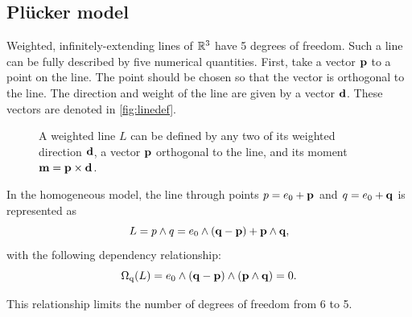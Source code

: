 \subsection{Pl\"ucker model}
\label{sec:hongbo}
\label{sec:plucker}


Weighted, infinitely-extending lines of $\mathbb{R}^3$ have 5 degrees of freedom.  Such a line can be fully described by five numerical quantities. First, take a vector $\mathbf{p}$ to a point on the line.  The point should be chosen so that the vector is orthogonal to the line.  The direction and weight of the line are given by a vector $\mathbf{d}$.  These vectors are denoted in \autoref{fig:linedef}.

\begin{figure}
  \caption{A weighted line $L$ can be defined by any two of its weighted direction $\mathbf{d}$, a vector $\mathbf{p}$ orthogonal to the line, and its moment $\mathbf{m} = \mathbf{p} \times \mathbf{d}$.}
  \label{fig:linedef}
  \begin{center}
  \end{center}
\end{figure}

In the homogeneous model, the line through points $p = e_0 + \mathbf{p}$ and $q = e_0 + \mathbf{q}$ is represented as 
\begin{equation*}
  L = p \wedge q = e_0 \wedge (\mathbf{q} - \mathbf{p}) + \mathbf{p} \wedge \mathbf{q} ,
\end{equation*}
with the following dependency relationship: 
\begin{equation} \label{eq:gaplucker0} 
  \operatorname{\Omega_q}(L) = e_0 \wedge (\mathbf{q} - \mathbf{p}) \wedge (\mathbf{p} \wedge \mathbf{q}) = 0 .
\end{equation}

This relationship limits the number of degrees of freedom from 6 to 5.

